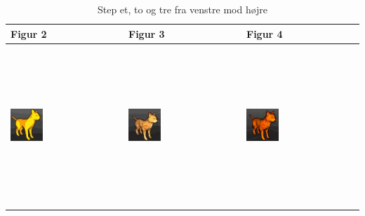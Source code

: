  \begin{table}[h!]
     \begin{center}
     \begin{tabular}{ | l | l | l | }
     \hline
      Figur 2 & Figur 3 & Figur 4 \\ \hline
     \includegraphics[width=0.3\textwidth,height=60mm]{Files/CelShading/silhouette4.pdf}
     
     &
     \includegraphics[width=0.3\textwidth, height=60mm]{Files/CelShading/silhouette5.pdf}
    
     &
     \includegraphics[width=0.3\textwidth, height=60mm]{Files/CelShading/silhouette6.jpg}
    
   \\ \hline
     
   \end{tabular}
   \caption{Step et, to og tre fra venstre mod højre
   \label{figtbl:modulation}}
   \end{center}
   \end{table}